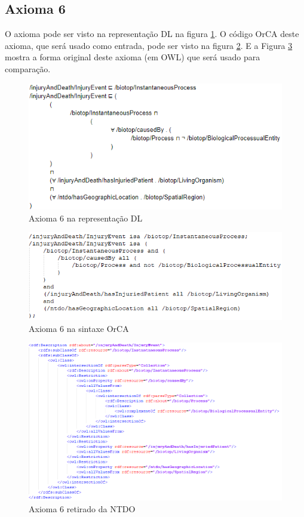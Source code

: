 \documentclass{bcc}
\begin{document}
\subsection{Axioma 6}
O axioma pode ser visto na representação DL na figura \ref{fig:axioma6_dl}. O código OrCA deste axioma, que será usado como entrada, pode ser visto na figura \ref{fig:axioma6_orca}. E a Figura \ref{fig:axioma6_o} mostra a forma original deste axioma (em OWL) que será usado para comparação. 

\begin{figure}[H]
\centering
\includegraphics[width=.7\textwidth]{Figuras/axioma6_dl.png}
\caption{Axioma 6 na representação DL} 
\label{fig:axioma6_dl}
\end{figure}

\begin{figure}[H]
\centering
\includegraphics[width=.7\textwidth]{Figuras/axioma6_orca.png}
\caption{Axioma 6 na sintaxe OrCA} 
\label{fig:axioma6_orca}
\end{figure}

\begin{figure}[H]
\centering
\includegraphics[width=1\textwidth]{Figuras/axioma6_o.png}
\caption{Axioma 6 retirado da NTDO} 
\label{fig:axioma6_o}
\end{figure}
\end{document}

